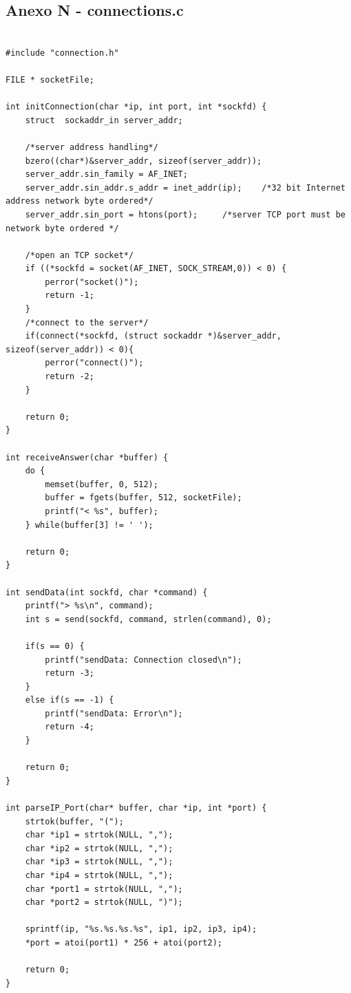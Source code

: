 \documentclass[11pt]{article}
\begin{document}
\subsection{ Anexo N - connections.c}

\begin{lstlisting}[style=CStyle]

#include "connection.h"

FILE * socketFile;

int initConnection(char *ip, int port, int *sockfd) {
    struct	sockaddr_in server_addr;

    /*server address handling*/
	bzero((char*)&server_addr, sizeof(server_addr));
	server_addr.sin_family = AF_INET;
	server_addr.sin_addr.s_addr = inet_addr(ip);	/*32 bit Internet address network byte ordered*/
	server_addr.sin_port = htons(port);		/*server TCP port must be network byte ordered */
    
	/*open an TCP socket*/
	if ((*sockfd = socket(AF_INET, SOCK_STREAM,0)) < 0) {
        perror("socket()");
        return -1;
    }
	/*connect to the server*/
    if(connect(*sockfd, (struct sockaddr *)&server_addr, sizeof(server_addr)) < 0){
        perror("connect()");
        return -2;
	}

    return 0;
}

int receiveAnswer(char *buffer) {
    do {
        memset(buffer, 0, 512);
        buffer = fgets(buffer, 512, socketFile);
        printf("< %s", buffer);
    } while(buffer[3] != ' ');

    return 0;
}

int sendData(int sockfd, char *command) {
    printf("> %s\n", command);
    int s = send(sockfd, command, strlen(command), 0);

    if(s == 0) {
        printf("sendData: Connection closed\n");
        return -3;
    }
    else if(s == -1) {
        printf("sendData: Error\n");
        return -4;
    }

    return 0;
}

int parseIP_Port(char* buffer, char *ip, int *port) {
    strtok(buffer, "(");
    char *ip1 = strtok(NULL, ",");
    char *ip2 = strtok(NULL, ",");
    char *ip3 = strtok(NULL, ",");
    char *ip4 = strtok(NULL, ",");
    char *port1 = strtok(NULL, ",");
    char *port2 = strtok(NULL, ")");

    sprintf(ip, "%s.%s.%s.%s", ip1, ip2, ip3, ip4);
    *port = atoi(port1) * 256 + atoi(port2);

    return 0;
}


\end{lstlisting}
\end{document}
